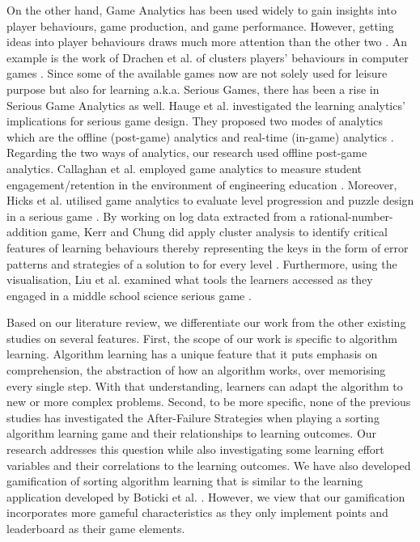 \documentclass[conference]{IEEEtran}
\begin{document}
On the other hand, Game Analytics has been used widely to gain insights into player behaviours, game production, and game performance. However, getting ideas into player behaviours draws much more attention than the other two \cite{bauckhage2015age}. An example is the work of Drachen et al. of clusters players’ behaviours in computer games \cite{drachen2012guns}. Since some of the available games now are not solely used for leisure purpose but also for learning a.k.a. Serious Games, there has been a rise in Serious Game Analytics as well. Hauge et al. investigated the learning analytics’ implications for serious game design. They proposed two modes of analytics which are the offline (post-game) analytics and real-time (in-game) analytics \cite{hauge2014analytics}. Regarding the two ways of analytics, our research used offline post-game analytics. Callaghan et al. employed game analytics to measure student engagement/retention in the environment of engineering education \cite{callaghan2014analytics}. Moreover, Hicks et al. utilised game analytics to evaluate level progression and puzzle design in a serious game \cite{hicks2016analytics}. By working on log data extracted from a rational-number-addition game, Kerr and Chung did apply cluster analysis to identify critical features of learning behaviours thereby representing the keys in the form of error patterns and strategies of a solution to for every level \cite{kerr2012identifying}. Furthermore, using the visualisation, Liu et al. examined what tools the learners accessed as they engaged in a middle school science serious game \cite{Liu2015}.

Based on our literature review, we differentiate our work from the other existing studies on several features. First, the scope of our work is specific to algorithm learning. Algorithm learning has a unique feature that it puts emphasis on comprehension, the abstraction of how an algorithm works, over memorising every single step. With that understanding, learners can adapt the algorithm to new or more complex problems. Second, to be more specific, none of the previous studies has investigated the After-Failure Strategies when playing a sorting algorithm learning game and their relationships to learning outcomes. Our research addresses this question while also investigating some learning effort variables and their correlations to the learning outcomes. We have also developed gamification of sorting algorithm learning that is similar to the learning application developed by Boticki et al. \cite{boticki2013sorting}. However, we view that our gamification incorporates more gameful characteristics as they only implement points and leaderboard as their game elements.
\end{document}
